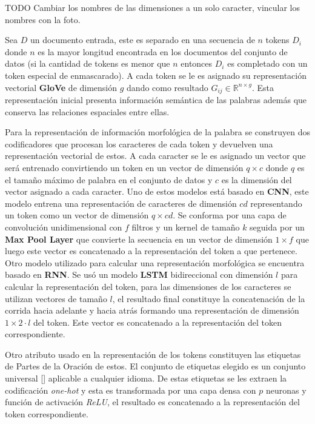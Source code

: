 TODO Cambiar los nombres de las dimensiones a un solo caracter, vincular los nombres con la foto.

Sea $D$ un documento entrada, este es separado en una secuencia de $n$ tokens $D_i$ donde $n$ es la mayor longitud encontrada
en los documentos del conjunto de datos (si la cantidad de tokens es menor que $n$ entonces $D_i$ es completado con un token especial de enmascarado). 
A cada token se le es asignado
su representación vectorial \textbf{GloVe} de dimensión $g$ dando como resultado $G_{ij} \in \mathbb{R}^{n \times g}$.
Esta representación inicial presenta información semántica de las palabras además que conserva las relaciones 
espaciales entre ellas. 

Para la representación de información morfológica de la palabra se construyen dos
codificadores que procesan los caracteres de cada token y devuelven una representación vectorial de estos.
A cada caracter se le es asignado un vector que será entrenado convirtiendo un token en un vector de dimensión
$q \times c$ donde $q$ es el tamaño máximo de palabra en el conjunto de datos y $c$ es la dimensión del vector
asignado a cada caracter.
Uno de estos modelos está basado en \textbf{CNN}, este modelo entrena una representación de caracteres de dimensión
$cd$ representando un token como un vector de dimensión $q \times cd$. Se conforma por una capa de convolución unidimensional
con $f$ filtros y un kernel de tamaño $k$ seguida por un \textbf{Max Pool Layer} que convierte la secuencia en un vector
de dimensión $1 \times f$ que luego este vector es concatenado a la representación del token a que pertenece.
Otro modelo utilizado para calcular una representación morfológica se encuentra basado en \textbf{RNN}. Se usó
un modelo \textbf{LSTM} bidireccional con dimensión $l$ para calcular la representación del token, para las dimensiones de los caracteres se
utilizan vectores de tamaño $l$, el resultado final constituye la concatenación de la corrida hacia adelante y
hacia atrás formando una representación de dimensión $1 \times 2·l$ del token. Este vector es concatenado a la representación
del token correspondiente.

Otro atributo usado en la representación de los tokens constituyen las etiquetas de Partes de la Oración de estos.
El conjunto de etiquetas elegido es un conjunto universal [\cite{petrov2011universal}] aplicable a cualquier idioma.
De estas etiquetas se les extraen la codificación \emph{one-hot} y esta es transformada por una capa densa con $p$ neuronas
y función de activación \emph{ReLU}, el resultado es concatenado a la representación del token correspondiente.

